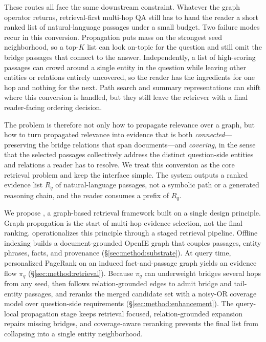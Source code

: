 These routes all face the same downstream constraint. Whatever the
graph operator returns, retrieval-first multi-hop QA still has to hand
the reader a short ranked list of natural-language passages under a
small budget. Two failure modes recur in this conversion. Propagation
puts mass on the strongest seed neighborhood, so a top-$K$ list can
look on-topic for the question and still omit the bridge passages that
connect to the answer. Independently, a list of high-scoring passages
can crowd around a single entity in the question while leaving other
entities or relations entirely uncovered, so the reader has the
ingredients for one hop and nothing for the next. Path search and
summary representations can shift where this conversion is handled, but
they still leave the retriever with a final reader-facing ordering
decision.

The problem is therefore not only how to propagate relevance over a
graph, but how to turn propagated relevance into evidence that is both
\emph{connected}---preserving the bridge relations that span
documents---and \emph{covering}, in the sense that the selected
passages collectively address the distinct question-side entities and
relations a reader has to resolve. We treat this conversion as the core
retrieval problem and keep the interface simple. The system outputs a
ranked evidence list $R_q$ of natural-language passages, not a symbolic
path or a generated reasoning chain, and the reader consumes a prefix
of $R_q$.

We propose \methodname{}, a graph-based retrieval framework built on a
single design principle. Graph propagation is the start of multi-hop
evidence selection, not the final ranking. \methodname{} operationalizes
this principle through a staged retrieval pipeline. Offline indexing
builds a document-grounded OpenIE graph that
couples passages, entity phrases, facts, and provenance
(\S\ref{sec:method:substrate}). At query time, personalized
PageRank on an induced fact-and-passage graph yields an evidence flow
$\pi_q$ (\S\ref{sec:method:retrieval}). Because $\pi_q$ can underweight
bridges several hops from any seed, \methodname{} then follows
relation-grounded edges to admit bridge and tail-entity passages, and
reranks the merged candidate set with a noisy-OR coverage model over
question-side requirements (\S\ref{sec:method:enhancement}). The
query-local propagation stage keeps retrieval focused,
relation-grounded expansion repairs missing bridges, and coverage-aware
reranking prevents the final list from collapsing into a single entity
neighborhood.

